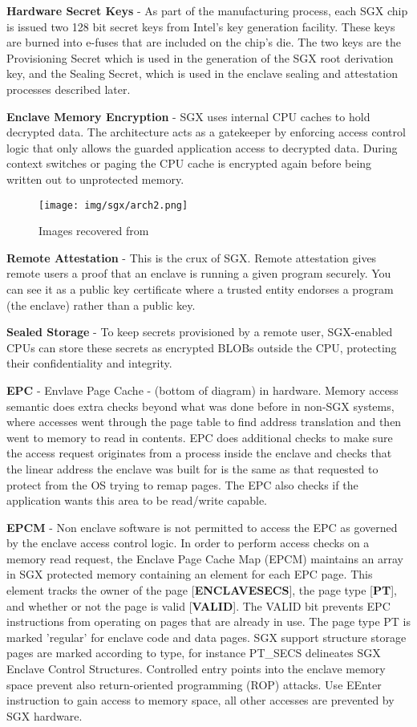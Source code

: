 \textbf{Hardware Secret Keys} - As part of the manufacturing process, each SGX chip is issued two 128 bit secret keys from Intel's key generation facility. These keys are burned into e-fuses that are included on the chip's die. The two keys are the Provisioning Secret which is used in the generation of the SGX root derivation key, and the Sealing Secret, which is used in the enclave sealing and attestation processes described later. 

\textbf{Enclave Memory Encryption} - SGX uses internal CPU caches to hold decrypted data. The architecture acts as a gatekeeper by enforcing access control logic that only allows the guarded application access to decrypted data. During context switches or paging the CPU cache is encrypted again before being written out to unprotected memory.

\begin{figure}[H]
\centering
\texttt{[image: img/sgx/arch2.png]}
\caption{Images recovered from \cite{Xu_Cui_Peinado_2015}}
\end{figure}


\textbf{Remote Attestation} - This is the crux of SGX. Remote attestation gives remote users a proof that an enclave is running a given
program securely. You can see it as a public key certificate where a trusted entity endorses a program (the enclave) rather than a
public key.

\textbf{Sealed Storage} - To keep secrets provisioned by a remote user, SGX-enabled CPUs can store these secrets as encrypted BLOBs
outside the CPU, protecting their confidentiality and integrity.

\textbf{EPC} - Envlave Page Cache - (bottom of diagram) in hardware. Memory access semantic does extra checks beyond what was done before in non-SGX systems, where accesses went through the page table to find address translation and then went to memory to read in contents. EPC does additional checks to make sure the access request originates from a process inside the enclave and checks that the linear address the enclave was built for is the same as that requested to protect from the OS trying to remap pages. The EPC also checks if the application wants this area to be read/write capable. 

\textbf{EPCM} - Non enclave software is not permitted to access the EPC as governed by the enclave access control logic. In order to perform access checks on a memory read request, the Enclave Page Cache Map (EPCM) maintains an array in SGX protected memory containing an element for each EPC page. This element tracks the owner of the page  [\textbf{ENCLAVESECS}], the page type [\textbf{PT}], and whether or not the page is valid [\textbf{VALID}]. The VALID bit prevents EPC instructions from operating on pages that are already in use. The page type PT is marked 'regular' for enclave code and data pages. SGX support structure storage pages are marked according to type, for instance PT\_SECS delineates SGX Enclave Control Structures. Controlled entry points into the enclave memory space prevent also return-oriented programming (ROP) attacks. Use EEnter instruction to gain access to memory space, all other accesses are prevented by SGX hardware.

